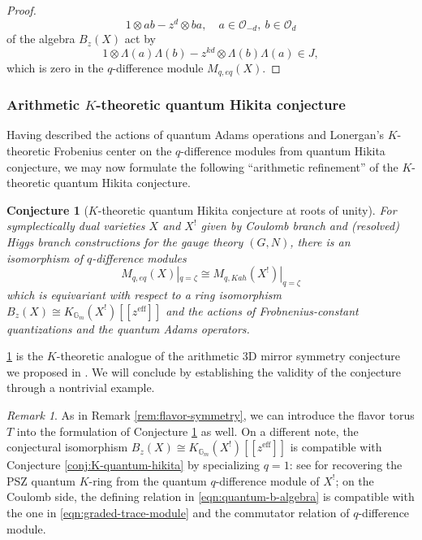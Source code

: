 \documentclass[reqno]{amsart}
\numberwithin{equation}{section}
\numberwithin{equation}{section}
\numberwithin{equation}{section}
\newtheorem{conj}[thm]{Conjecture}
\theoremstyle{definition}
\theoremstyle{remark}
\theoremstyle{remark}
\newtheorem{rem}[thm]{Remark}
\begin{document}
\begin{proof}
    \begin{equation}
        1 \otimes ab - z^d \otimes ba, \quad a \in \mathcal{O}_{-d},\  b \in \mathcal{O}_d
    \end{equation}
    of the algebra $B_z(X)$ act by
    \begin{equation}
        1 \otimes \Lambda(a) \Lambda(b) - z^{kd} \otimes \Lambda(b) \Lambda(a) \in J,
    \end{equation}
    which is zero in the $q$-difference module $M_{q,eq}(X)$.
    
\end{proof}

\subsubsection{Arithmetic $K$-theoretic quantum Hikita conjecture}

Having described the actions of quantum Adams operations and Lonergan's $K$-theoretic Frobenius center on the $q$-difference modules from quantum Hikita conjecture, we may now formulate the following ``arithmetic refinement'' of the $K$-theoretic quantum Hikita conjecture.

\begin{conj}[$K$-theoretic quantum Hikita conjecture at roots of unity]\label{conj:arithmetic-k-hikita}
    For symplectically dual varieties $X$ and $X^!$ given by Coulomb branch and (resolved) Higgs branch constructions for the gauge theory $(G,N)$, there is an isomorphism of $q$-difference modules
    \begin{equation}
        M_{q, eq}(X)|_{q=\zeta} \cong M_{q, Kah}(X^!)|_{q=\zeta}
    \end{equation}
    which is equivariant with respect to a ring isomorphism $B_z(X) \cong K_{\mathbb{G}_m}(X^!)[\![z^{\mathrm{eff}}]\!]$ and the actions of Frobnenius-constant quantizations and the quantum Adams operators.
\end{conj}

\cref{conj:arithmetic-k-hikita} is the $K$-theoretic analogue of the arithmetic 3D mirror symmetry conjecture we proposed in \cite[Conjecture 3.21]{bai-lee}. We will conclude by establishing the validity of the conjecture through a nontrivial example.

\begin{rem}
    As in Remark \ref{rem:flavor-symmetry}, we can introduce the flavor torus $T$ into the formulation of Conjecture \ref{conj:arithmetic-k-hikita} as well. On a different note, the conjectural isomorphism $B_z(X) \cong K_{\mathbb{G}_m}(X^!)[\![z^{\mathrm{eff}}]\!]$ is compatible with Conjecture \ref{conj:K-quantum-hikita} by specializing $q=1$: see \cite[Theorem 16]{PSZ-quantum} for recovering the PSZ quantum $K$-ring from the quantum $q$-difference module of $X^!$; on the Coulomb side, the defining relation in \eqref{eqn:quantum-b-algebra} is compatible with the one in \eqref{eqn:graded-trace-module} and the commutator relation of $q$-difference module.
\end{rem}
\end{document}
